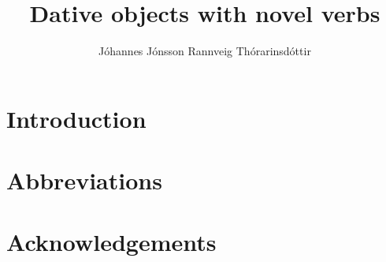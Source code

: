 \documentclass[output=paper]{langsci/langscibook}
\author{Jóhannes Jónsson\affiliation{}\lastand
Rannveig Thórarinsdóttir\affiliation{}}
\title{Dative objects with novel verbs}
\begin{document}
\section{Introduction}  
 
\section*{Abbreviations}
\section*{Acknowledgements}

\sloppy
\printbibliography[heading=subbibliography,notkeyword=this] 
\end{document}
